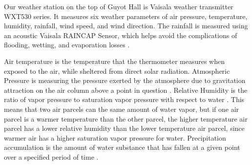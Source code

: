 \documentclass[11pt]{report}
\begin{document}
% 

Our weather station on the top of Guyot Hall is Vaisala weather transmitter
WXT530 series. It measures six weather parameters of air pressure,
temperature, humidity, rainfall, wind speed, and wind direction. The
rainfall is measured using an acoustic Vaisala RAINCAP Sensor, which helps
avoid the complications of flooding, wetting, and evaporation losses
\cite[]{Vaisala}. 

Air temperature is the temperature that the thermometer measures when exposed to the air, while sheltered from direct solar radiation.
Atmospheric Pressure is measuring the pressure exerted by the atmosphere due to gravitation attraction on the air column above a point in question \cite{AMS}.  
Relative Humidity is the ratio of vapor pressure to saturation vapor pressure with respect to water \cite{AMS}.  
This means that two air parcels can the same amount of water vapor, but if one air parcel is a warmer temperature than the other parcel,
the higher temperature air parcel has a lower relative humidity than the lower 
temperature air parcel, since warmer air has a higher saturation vapor pressure for water. 
Precipitation accumulation is the amount of water substance that has fallen at a given point over a specified period of time \cite{AMS}. 
\end{document}
